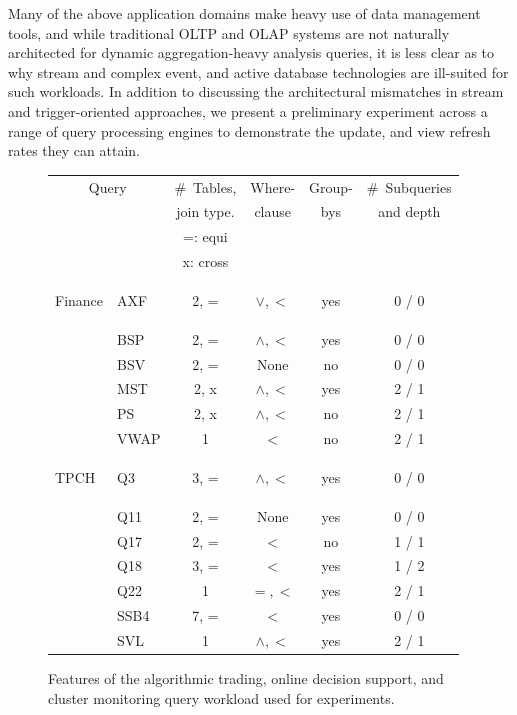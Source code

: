 Many of the above application domains make heavy use of data management tools,
and while traditional OLTP and OLAP systems are not naturally architected for
dynamic aggregation-heavy analysis queries, it is less clear as to why stream
and complex event, and active database technologies are ill-suited for such
workloads. In addition to discussing the architectural mismatches in stream and
trigger-oriented approaches, we present a preliminary experiment across a range
of query processing engines to demonstrate the update, and view refresh rates
they can attain.

\begin{figure}[htbp]
\scriptsize{
\begin{center}
\begin{tabular}{ p{0.15cm} | l | c | c | c  | c }
\multicolumn{2}{c|}{Query} & \#~Tables,  & Where- & Group- & \#~Subqueries\\
                         & & join type.  & clause & bys    & and depth\\
\multicolumn{2}{c|}{}      & =: equi     &        &        & \\
                         & & x: cross    &        &        & \\
\hline
\begin{rotate}{90}\hspace{-1.1cm}Finance\end{rotate}
& AXF        & 2, =      & $\vee, <$     & yes & 0 / 0 \\
& BSP        & 2, =      & $\wedge, <$   & yes & 0 / 0 \\
& BSV        & 2, =      & None          & no  & 0 / 0 \\
& MST        & 2, x      & $\wedge, <$   & yes & 2 / 1 \\
& PS         & 2, x      & $\wedge, <$   & no  & 2 / 1 \\
& VWAP       & 1         & $<$           & no  & 2 / 1 \\
\hline
\begin{rotate}{90}\hspace{-1.1cm}TPCH\end{rotate}
& Q3         & 3, =      & $\wedge, <$   & yes & 0 / 0 \\
& Q11        & 2, =      & None          & yes & 0 / 0 \\
& Q17        & 2, =      & $<$           & no  & 1 / 1 \\
& Q18        & 3, =      & $<$           & yes & 1 / 2 \\
& Q22        & 1         & $=,<$         & yes & 2 / 1 \\
& SSB4       & 7, =      & $<$           & yes & 0 / 0 \\
\hline
& SVL        & 1         & $\wedge, <$   & yes & 2 / 1 \\
\end{tabular}
\end{center}
}
\vspace{-4mm}
\caption{Features of the algorithmic trading, online decision support, and
cluster monitoring query workload used for experiments.}
\label{fig:queries}
\end{figure}

